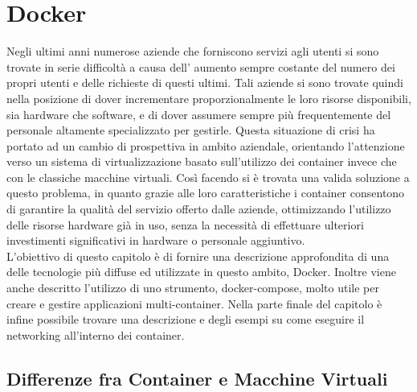 

\chapter{Docker} \label{ch:docker}


Negli ultimi anni numerose aziende che forniscono servizi agli utenti si sono trovate in serie difficoltà a causa dell' aumento sempre costante del numero
dei propri utenti e delle richieste di questi ultimi. Tali aziende si sono trovate quindi nella posizione di dover incrementare proporzionalmente le loro risorse disponibili, sia hardware che software, e di dover
assumere sempre più frequentemente del personale altamente specializzato per gestirle. Questa situazione di crisi ha portato ad un cambio di prospettiva in ambito aziendale, orientando l'attenzione verso un sistema di virtualizzazione
basato sull'utilizzo dei container invece che con le classiche macchine virtuali. Così facendo si è trovata una valida soluzione a questo problema, in quanto grazie alle loro caratteristiche i container consentono di garantire
la qualità del servizio offerto dalle aziende, ottimizzando l'utilizzo delle risorse hardware già in uso, senza la necessità di effettuare ulteriori investimenti significativi in hardware o personale aggiuntivo.\\
L'obiettivo di questo capitolo è di fornire una descrizione approfondita di una delle tecnologie più diffuse ed utilizzate in questo ambito, Docker\cite{docker-docs}. Inoltre viene anche descritto l'utilizzo di uno strumento, docker-compose, molto utile per 
creare e gestire applicazioni multi-container. Nella parte finale del capitolo è infine possibile trovare una descrizione e degli esempi su come eseguire il networking all'interno dei container.

\section{Differenze fra Container e Macchine Virtuali} 

